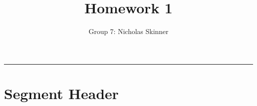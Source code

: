 \documentclass[letterpaper,10pt,fleqn]{article}
\title{Homework 1}
\author{Group 7: Nicholas Skinner}
\begin{document}
	\maketitle
	\hrule
	
	\section*{Segment Header}
\end{document}
